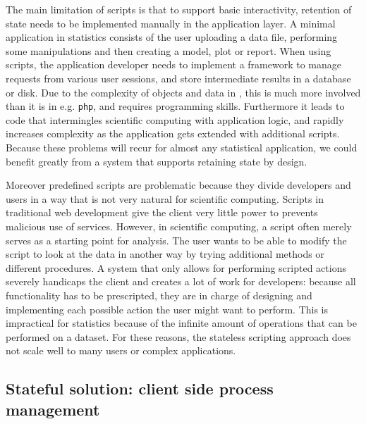 The main limitation of scripts is that to support basic interactivity, retention of state needs to be implemented manually in the application layer. A minimal application in statistics consists of the user uploading a data file, performing some manipulations and then creating a model, plot or report. When using scripts, the application developer needs to implement a framework to manage requests from various user sessions, and store intermediate results in a database or disk. Due to the complexity of objects and data in \R, this is much more involved than it is in e.g. \texttt{php}, and requires programming skills. Furthermore it leads to code that intermingles scientific computing with application logic, and rapidly increases complexity as the application gets extended with additional scripts.
Because these problems will recur for almost any statistical application, we could benefit greatly from a system that supports retaining state by design.

Moreover predefined scripts are problematic because they divide developers and users in a way that is not very natural for scientific computing. Scripts in traditional web development give the client very little power to prevents malicious use of services. However, in scientific computing, a script often merely serves as a starting point for analysis. The user wants to be able to modify the script to look at the data in another way by trying additional methods or different procedures. A system that only allows for performing scripted actions severely handicaps the client and creates a lot of work for developers: because all functionality has to be prescripted, they are in charge of designing and implementing each possible action the user might want to perform. This is impractical for statistics because of the infinite amount of operations that can be performed on a dataset. For these reasons, the stateless scripting approach does not scale well to many users or complex applications.

\subsection{Stateful solution: client side process management}

